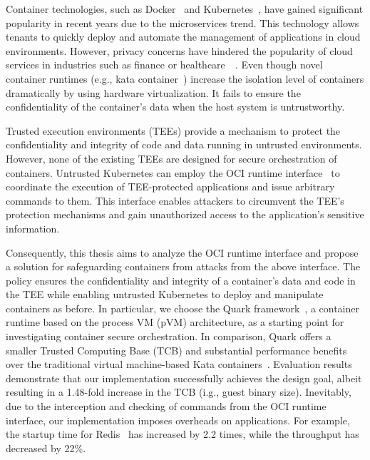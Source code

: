 




Container technologies, such as Docker~\cite*{docker} and Kubernetes~\cite*{k8s}, have gained significant popularity in recent years due to the microservices trend. This technology allows tenants to quickly deploy and automate the management of applications in cloud environments. However, privacy concerns 
have hindered the popularity of cloud services in industries such as finance or healthcare~\cite*{data_privacy}~\cite*{eu_data_Privacy}. Even though novel container runtimes (e.g., kata container~\cite*{Kata-Containers}) increase the isolation level of containers dramatically by using hardware virtualization. 
It fails to ensure the confidentiality of the container's data when the host system is untrustworthy.

Trusted execution environments (\acrshort{TEE}s) provide a mechanism to protect the confidentiality and integrity of code and data running in untrusted environments. However, none of the existing TEEs are designed for secure orchestration of containers. Untrusted Kubernetes can employ the OCI runtime interface~\cite*{oci-runtime-spec} to coordinate the execution of 
TEE-protected applications and issue arbitrary commands to them. This interface enables attackers to circumvent the TEE's protection mechanisms and gain unauthorized access to the application's sensitive information.

Consequently, this thesis aims to analyze the OCI runtime interface and propose a solution for safeguarding containers from attacks from the above interface. The policy ensures the confidentiality and integrity of a container's data and code in the TEE while enabling untrusted Kubernetes\cite*{k8s} to deploy and manipulate containers as 
before. In particular, we choose the Quark framework~\cite*{quark}, a container runtime based on the process VM (\acrshort{pVM}) architecture, as a starting point for investigating container secure orchestration. In comparison, Quark offers a smaller Trusted Computing Base (\acrshort{TCB}) and substantial performance 
benefits over the traditional virtual machine-based Kata containers~\cite*{quark_performance_report}. Evaluation results demonstrate that our implementation successfully achieves the design goal, albeit resulting in a 1.48-fold increase in the \acrshort{TCB} (i.g., guest binary size). Inevitably, due to the interception and 
checking of commands from the OCI runtime interface, our implementation imposes overheads on applications.  For example, the startup time for Redis~\cite*{redis} has increased by 2.2 times, while the throughput has decreased by 22\%.


